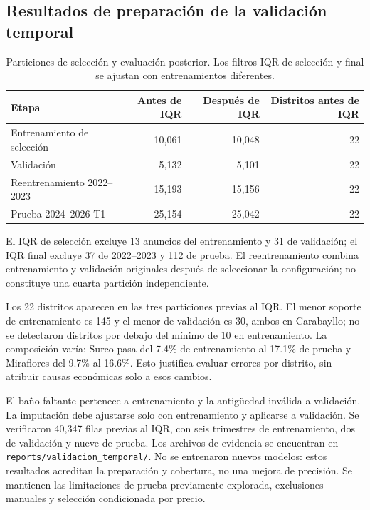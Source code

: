 \documentclass[11pt,a4paper]{article}
\begin{document}
\subsection{Resultados de preparación de la validación temporal}
\begin{table}[H]
\centering
\small
\caption{Particiones de selección y evaluación posterior. Los filtros IQR de selección y final se ajustan con entrenamientos diferentes.}
\begin{tabular}{lrrr}
\toprule
Etapa & Antes de IQR & Después de IQR & Distritos antes de IQR \\
\midrule
Entrenamiento de selección & 10,061 & 10,048 & 22 \\
Validación & 5,132 & 5,101 & 22 \\
Reentrenamiento 2022--2023 & 15,193 & 15,156 & 22 \\
Prueba 2024--2026-T1 & 25,154 & 25,042 & 22 \\
\bottomrule
\end{tabular}
\end{table}

El IQR de selección excluye 13 anuncios del entrenamiento y 31 de validación; el IQR final excluye 37 de 2022--2023 y 112 de prueba. El reentrenamiento combina entrenamiento y validación originales después de seleccionar la configuración; no constituye una cuarta partición independiente.

Los 22 distritos aparecen en las tres particiones previas al IQR. El menor soporte de entrenamiento es 145 y el menor de validación es 30, ambos en Carabayllo; no se detectaron distritos por debajo del mínimo de 10 en entrenamiento. La composición varía: Surco pasa del 7.4\% de entrenamiento al 17.1\% de prueba y Miraflores del 9.7\% al 16.6\%. Esto justifica evaluar errores por distrito, sin atribuir causas económicas solo a esos cambios.

El baño faltante pertenece a entrenamiento y la antigüedad inválida a validación. La imputación debe ajustarse solo con entrenamiento y aplicarse a validación. Se verificaron 40,347 filas previas al IQR, con seis trimestres de entrenamiento, dos de validación y nueve de prueba. Los archivos de evidencia se encuentran en \texttt{reports/validacion\_temporal/}. No se entrenaron nuevos modelos: estos resultados acreditan la preparación y cobertura, no una mejora de precisión. Se mantienen las limitaciones de prueba previamente explorada, exclusiones manuales y selección condicionada por precio.
\end{document}
